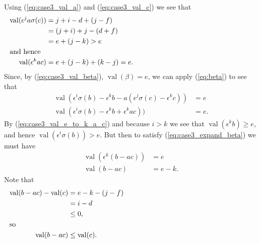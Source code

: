 \documentclass{amsart}
\theoremstyle{definition}
\def\e{\epsilon}
\def\val{\mathop{\mathrm{val}}}
\def\s{\sigma}
\begin{document}
  Using (\ref{eq:case3_val_a}) and (\ref{eq:case3_val_c}) we see that
  \begin{align}
    \val(\e^j a\s(c)) &=  j + i - d  + (j -f) \nonumber \\
                      &=  (j+i) + j - (d + f) \nonumber \\
                      &= e + (j - k) > e \nonumber \\
    \noalign{\noindent and hence}
    \label{eq:case3_val_e_to_k_a_c}
    \val(\e^k a c) &= e + (j - k) + (k - j) = e.
  \end{align}
  Since, by (\ref{eq:case3_val_beta}), $\val(\beta) = e$, we can apply
  (\ref{eq:beta}) to see that
  \begin{align}
    \val(\e^i\s(b) - \e^k b - a(\e^j \s(c) - \e^k c)) &= e \nonumber \\
    \label{eq:case3_expand_beta}
    \val(\e^i\s(b) - \e^k b + \e^k ac)) &= e.
  \end{align}
  By (\ref{eq:case3_val_e_to_k_a_c}) and because $i > k$ we see that
  $\val(\e^kb) \ge e$, and hence $\val(\e^i\s(b)) > e$.  But then to satisfy
  (\ref{eq:case3_expand_beta}) we must have
  \begin{align}
    \val(\e^k(b-ac)) &= e \nonumber \\
    \label{eq:case3_val_b_m_ac}
    \val(b-ac) &= e-k.
  \end{align}
  Note that
  \begin{align}
    \val(b-ac) - \val(c) &= e - k - (j -f) \nonumber \\
                         &= i - d \nonumber \\
                         &\le 0, \nonumber \\
    \noalign{\noindent so}
    \val(b-ac) &\le \val(c).
  \end{align}
\end{document}
